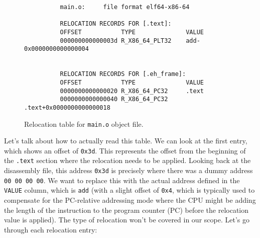       \begin{figure}[H]
        \centering 
        \begin{lstlisting}
          main.o:     file format elf64-x86-64

          RELOCATION RECORDS FOR [.text]:
          OFFSET           TYPE              VALUE 
          000000000000003d R_X86_64_PLT32    add-0x0000000000000004


          RELOCATION RECORDS FOR [.eh_frame]:
          OFFSET           TYPE              VALUE 
          0000000000000020 R_X86_64_PC32     .text
          0000000000000040 R_X86_64_PC32     .text+0x0000000000000018
        \end{lstlisting}
        \caption{Relocation table for \texttt{main.o} object file. } 
        \label{fig:relocation_table}
      \end{figure}

      Let's talk about how to actually read this table. We can look at the first entry, which shows an offset of \texttt{0x3d}. This represents the offset from the beginning of the \texttt{.text} section where the relocation needs to be applied. Looking back at the disassembly file, this address \texttt{0x3d} is precisely where there was a dummy address \texttt{00 00 00 00}. We want to replace this with the actual address defined in the \texttt{VALUE} column, which is \texttt{add} (with a slight offset of \texttt{0x4}, which is typically used to compensate for the PC-relative addressing mode where the CPU might be adding the length of the instruction to the program counter (PC) before the relocation value is applied). The type of relocation won't be covered in our scope. Let's go through each relocation entry: 

